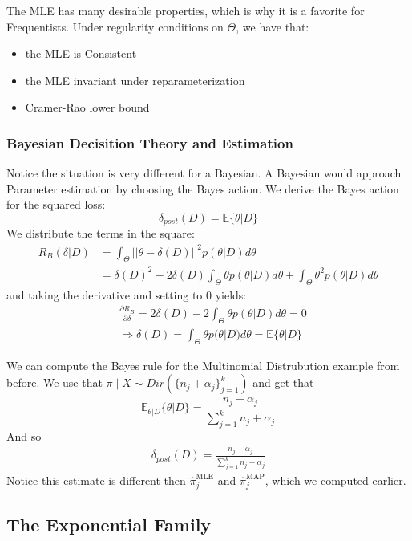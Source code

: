 \documentclass[]{article}
\theoremstyle{mattstyle}
\theoremstyle{definition}
\begin{document}
The MLE has many desirable properties, which is why it is a favorite for Frequentists. Under regularity conditions on $\Theta$, we have that:
\begin{itemize}
	\item the MLE is Consistent
	\item the MLE invariant under reparameterization
	\item Cramer-Rao lower bound
\end{itemize}

\newpage
\subsubsection{Bayesian Decisition Theory and Estimation}\label{bayeslosspred}
Notice the situation is very different for a Bayesian. A Bayesian would approach Parameter estimation by choosing the Bayes action. We derive the Bayes action for the squared loss:
$$\delta_{post}(D) = \mathbb{E}\{\theta|D\}$$
We distribute the terms in the square:
\begin{align*}
R_B(\delta|D) &= \int_{\Theta}^{}||\theta-\delta(D)||^2p(\theta|D)d\theta \\
&=\delta(D)^2 -2\delta(D)\int_{\Theta}^{}\theta p(\theta|D)d\theta+\int_{\Theta}^{}\theta^2 p(\theta|D)d\theta
\end{align*}
and taking the derivative and setting to 0 yields:
\begin{align*}
&\frac{\partial R_B}{\partial \delta} = 2\delta(D) -2\int_{\Theta}^{}\theta p(\theta|D)d\theta = 0 \\
&\Rightarrow \delta(D) = \int_{\Theta}^{}\theta p(\theta|D)d\theta = \mathbb{E}\{\theta|D\}
\end{align*}

We can compute the Bayes rule for the Multinomial Distrubution example from before. We use that $\pi \mid X \sim Dir\left(\{n_j + \alpha_j\}_{j=1}^k\right)$ and get that $$\mathbb{E}_{\theta|D}\{\theta|D\}=\frac{n_j + \alpha_j}{\sum_{j=1}^{k} n_j + \alpha_j}$$
And so
\begin{align*}
\boxed{\delta_{post}(D) =\frac{n_j + \alpha_j}{\sum_{j=1}^{k} n_j + \alpha_j} }
\end{align*}
Notice this estimate is different then $\hat{\pi}_{j}^{\text{MLE}}$ and $\hat{\pi}_{j}^{\text{MAP}}$, which we computed earlier.

\newpage

\subsection{The Exponential Family}\label{sec:expfam}
\end{document}

